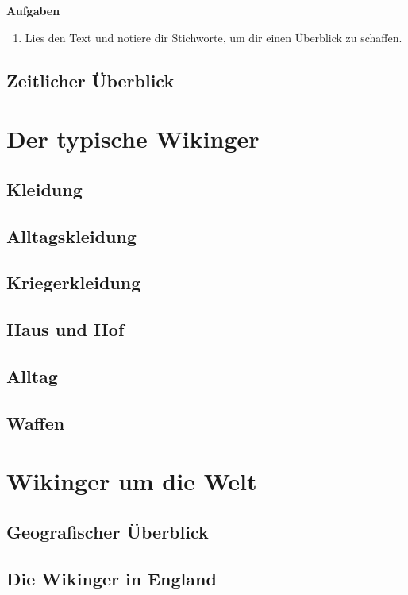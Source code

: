 \documentclass[12pt,a4paper,ngerman,openany]{book}
\newcommand{\aufgaben}[1]{
  \begin{tcolorbox}
    \textbf{Aufgaben}
    \begin{enumerate}
      #1
    \end{enumerate}
  \end{tcolorbox}
}
\newcommand{\fchapter}[1]{\chapter{#1}\thispagestyle{chapterstyle}}
\begin{document}
\aufgaben {
  \item Lies den Text und notiere dir Stichworte, um dir einen Überblick zu schaffen.
}

\section{Zeitlicher Überblick}


\fchapter{Der typische Wikinger}

\section{Kleidung}
\section{Alltagskleidung}

\section{Kriegerkleidung}

\section{Haus und Hof} %

\section{Alltag} %

\lipsum[6]

\section{Waffen}

\lipsum[1-2]

\fchapter{Wikinger um die Welt}

\section{Geografischer Überblick}

\section{Die Wikinger in England}
\end{document}
